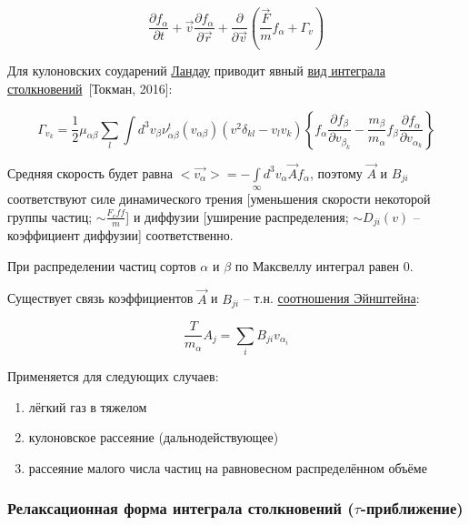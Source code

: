\documentclass[10pt, a4paper]{article}
\newcommand{\Tokman}{~[Токман, 2016]}
\begin{document}
\begin{equation*}
	\frac{\partial f_\alpha}{\partial t}+\vec{v}\frac{\partial f_\alpha}{\partial \vec{r}}+\frac{\partial}{\partial \vec{v}}\left(\frac{\vec{F}}{m}f_\alpha+\Gamma_v\right)
\end{equation*}

Для кулоновских соударений \uline{Ландау} приводит явный \uline{вид интеграла столкновений}\Tokman:

\begin{equation} \label{eq:Landau_collision_term}
	\Gamma_{v_{k}} = \frac{1}{2}\mu_{\alpha\beta}\sum\limits_{l}\int d^3v_\beta \nu_{\alpha\beta}^t(v_{\alpha\beta}) (v^2\delta_{kl}-v_lv_k)\left\{f_\alpha\frac{\partial f_\beta}{\partial v_{\beta_{k}}}-\frac{m_\beta}{m_\alpha}f_\beta\frac{\partial f_\alpha}{\partial v_{\alpha_{k}}}\right\}
\end{equation}

Средняя скорость будет равна $<\vec{v_\alpha}> = -\int\limits_{\infty}d^3v_\alpha \vec{A}f_\alpha$, поэтому $\vec{A}$ и $B_{ji}$ соответствуют силе динамического трения [уменьшения скорости некоторой группы частиц; $\sim \frac{F_eff}{m}$] и диффузии [уширение распределения; $\sim D_{ji}(v)$ -- коэффициент диффузии] соответственно. 

При распределении частиц сортов $\alpha$ и $\beta$ по Максвеллу интеграл равен 0.

Существует связь коэффициентов $\vec{A}$ и $B_{ji}$ -- т.н. \uline{соотношения Эйнштейна}:

\begin{equation} \label{eq:Einstein_relation}
	\frac{T}{m_\alpha}A_j = \sum\limits_{i} B_{ji} v_{\alpha_{i}}
\end{equation}

Применяется для следующих случаев:

\begin{enumerate} 
	\item лёгкий газ в тяжелом
	\item кулоновское рассеяние (дальнодействующее)
	\item рассеяние малого числа частиц на равновесном распределённом объёме
\end{enumerate}

\subsubsection{Релаксационная форма интеграла 	столкновений \linebreak ($\tau$-приближение)}
\end{document}
